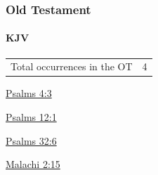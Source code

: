 	\subsubsection{Old Testament} %
		\label{GODLINESS-OT}
	
		\paragraph{KJV}
			\label{GODLINESS-OT-KJV}
	
			\begin{tabular}{ll}
				Total occurrences in the OT & 4
			\end{tabular}
			
			\begin{compactdesc}
				\item[{\hyperref[PSALMS-4-3]{Psalms 4:3}}]
				\item[{\hyperref[PSALMS-12-1]{Psalms 12:1}}]
				\item[{\hyperref[PSALMS-32-6]{Psalms 32:6}}]
				\item[{\hyperref[MALACHI-2-15]{Malachi 2:15}}]
			\end{compactdesc}
			
		
			
				
